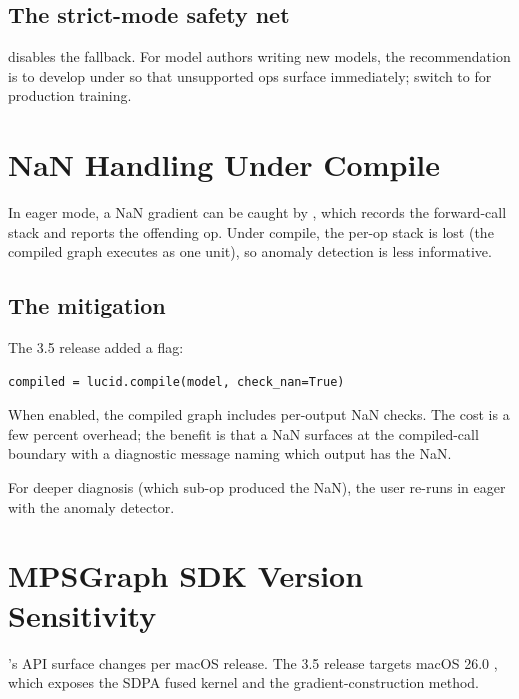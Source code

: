 \subsection{The strict-mode safety net}
\label{ssec:compile_hardening:strict_safety}

 disables the fallback. For
model authors writing new models, the recommendation is to
develop under  so that unsupported ops surface
immediately; switch to  for production
training.

\section{NaN Handling Under Compile}
\label{sec:compile_hardening:nan_handling}

In eager mode, a NaN gradient can be caught by
, which records the
forward-call stack and reports the offending op. Under compile,
the per-op stack is lost (the compiled graph executes as one
unit), so anomaly detection is less informative.

\subsection{The mitigation}
\label{ssec:compile_hardening:nan_mitigation}

The 3.5 release added a  flag:

\begin{lstlisting}[style=lucid,language=LucidPython]
compiled = lucid.compile(model, check_nan=True)
\end{lstlisting}

When enabled, the compiled graph includes per-output NaN checks.
The cost is a few percent overhead; the benefit is that a NaN
surfaces at the compiled-call boundary with a diagnostic message
naming which output has the NaN.

For deeper diagnosis (which sub-op produced the NaN), the user
re-runs in eager with the anomaly detector.

\section{MPSGraph SDK Version Sensitivity}
\label{sec:compile_hardening:sdk_sensitivity}

\MPSGraph's API surface changes per macOS release. The 3.5
release targets macOS 26.0 \MPSGraph, which exposes the SDPA
fused kernel and the gradient-construction method.

